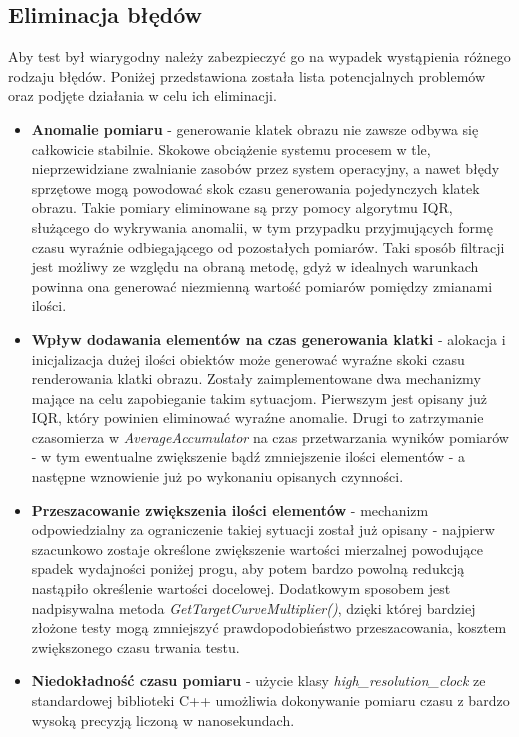 	\subsection{Eliminacja błędów}
	Aby test był wiarygodny należy zabezpieczyć go na wypadek wystąpienia różnego rodzaju błędów. Poniżej przedstawiona została lista potencjalnych problemów oraz podjęte działania w celu ich eliminacji.
	\begin{itemize}
		\item \textbf{Anomalie pomiaru} - generowanie klatek obrazu nie zawsze odbywa się całkowicie stabilnie. Skokowe obciążenie systemu procesem w tle, nieprzewidziane zwalnianie zasobów przez system operacyjny, a nawet błędy sprzętowe mogą powodować skok czasu generowania pojedynczych klatek obrazu. Takie pomiary eliminowane są przy pomocy algorytmu IQR, służącego do wykrywania anomalii, w tym przypadku przyjmujących formę czasu wyraźnie odbiegającego od pozostałych pomiarów. Taki sposób filtracji jest możliwy ze względu na obraną metodę, gdyż w idealnych warunkach powinna ona generować niezmienną wartość pomiarów pomiędzy zmianami ilości.
		\item \textbf{Wpływ dodawania elementów na czas generowania klatki} - alokacja i inicjalizacja dużej ilości obiektów może generować wyraźne skoki czasu renderowania klatki obrazu. Zostały zaimplementowane dwa mechanizmy mające na celu zapobieganie takim sytuacjom. Pierwszym jest opisany już IQR, który powinien eliminować wyraźne anomalie. Drugi to zatrzymanie czasomierza w \textit{AverageAccumulator} na czas przetwarzania wyników pomiarów - w tym ewentualne zwiększenie bądź zmniejszenie ilości elementów - a następne wznowienie już po wykonaniu opisanych czynności. 
		\item \textbf{Przeszacowanie zwiększenia ilości elementów} - mechanizm odpowiedzialny za ograniczenie takiej sytuacji został już opisany - najpierw szacunkowo zostaje określone zwiększenie wartości mierzalnej powodujące spadek wydajności poniżej progu, aby potem bardzo powolną redukcją nastąpiło określenie wartości docelowej. Dodatkowym sposobem jest nadpisywalna metoda \textit{GetTargetCurveMultiplier()}, dzięki której bardziej złożone testy mogą zmniejszyć prawdopodobieństwo przeszacowania, kosztem zwiększonego czasu trwania testu.
		\item \textbf{Niedokładność czasu pomiaru} - użycie klasy \textit{high\_resolution\_clock} ze standardowej biblioteki C++ umożliwia dokonywanie pomiaru czasu z bardzo wysoką precyzją liczoną w nanosekundach.
	\end{itemize}